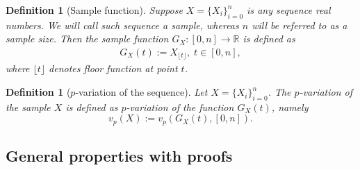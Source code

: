 \documentclass[12pt, a4paper]{article}
\newtheorem{definition}[theorem]{Definition}
\numberwithin{equation}{section}
\begin{document}
\begin{definition}[Sample function]\label{def:Seq2Fun}
  Suppose $X=\{X_{i}\}_{i=0}^{n}$ is 
  any sequence real numbers. 
  We will call such sequence a \emph{sample}, 
  whereas $n$ will be referred to as a 
  \emph{sample size}.
  Then the \emph{sample function}  
  $G_X:[0,n] \rightarrow \mathbb{R}$ is defined as 
  \begin{eqnarray}
    G_X(t) := X_{\lfloor t \rfloor},\;t\in[0,n],
  \end{eqnarray}
  where $\lfloor t \rfloor$ denotes floor 
  function at point $t$. 
\end{definition} 

\begin{definition}[$p$-variation of the sequence]\label{def:pvarseq}
  Let $X=\{X_i\}_{i=0}^n$. The $p$-variation
  of the sample $X$ is defined as $p$-variation of the 
  function $G_X(t)$, namely
  \begin{equation}
    v_p(X) := v_p(G_X(t),[0,n]).
  \end{equation}
\end{definition}


\subsection{General properties with proofs}
\end{document}
